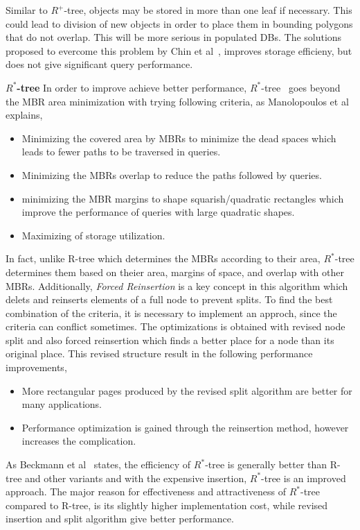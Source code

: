 \documentclass[a4paper,12pt]{article}
\begin{document}
Similar to $R^+$-tree, objects may be stored in more than one leaf if necessary. This could lead to division of new objects in order to place them in bounding polygons that do not overlap. This will be more serious in populated DBs. The solutions proposed to evercome this problem by Chin et al~\cite{survey}, improves storage efficieny, but does not give significant query performance. 

\textbf{$R^*$-tree}
In order to improve achieve better performance, $R^*$-tree~\cite{rstartree} goes beyond the MBR area minimization with trying following criteria, as Manolopoulos et al~\cite{Manolopoulos:2005} explains,
\begin{itemize}
\item Minimizing the covered area by MBRs to minimize the dead spaces which leads to fewer paths to be traversed in queries. 
\item Minimizing the MBRs overlap to reduce the paths followed by queries.
\item minimizing the MBR margins to shape squarish/quadratic rectangles which improve the performance of queries with large quadratic shapes.
\item Maximizing of storage utilization. 
\end{itemize}
In fact, unlike R-tree which determines the MBRs according to their area, $R^*$-tree determines them based on theier area, margins of space, and overlap with other MBRs. Additionally, \textit{Forced Reinsertion} is a key concept in this algorithm which delets and reinserts elements of a full node to prevent splits.
To find the best combination of the criteria, it is necessary to implement an approch, since the criteria can conflict sometimes. The optimizations is obtained with revised node split and also forced reinsertion which finds a better place for a node than its original place. This revised structure result in the following performance improvements,
\begin{itemize}
\item More rectangular pages produced by the revised split algorithm are better for many applications.
\item Performance optimization is gained through the reinsertion method, however increases the complication.
\end{itemize}
As Beckmann et al~\cite{rstartree} states, the efficiency of $R^*$-tree is generally better than R-tree and other variants and with the expensive insertion, $R^*$-tree is an improved approach. The major reason for effectiveness and attractiveness of $R^*$-tree compared to R-tree, is its slightly higher implementation cost, while revised insertion and split algorithm give better performance.
\end{document}
